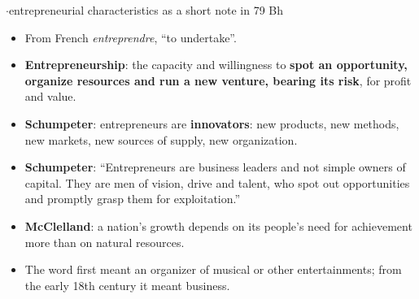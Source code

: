 {\color{sub}\footnotesize {}  \gap$\cdot$\gap entrepreneurial characteristics as a short note in 79 Bh}
\begin{itemize}
  \item From French \textit{entreprendre}, ``to undertake''.
  \item \textbf{Entrepreneurship}: the capacity and willingness to \textbf{spot an
    opportunity, organize resources and run a new venture, bearing its risk}, for profit and
    value.
  \item \textbf{Schumpeter}: entrepreneurs are \textbf{innovators}: new products, new
    methods, new markets, new sources of supply, new organization.
  \item \textbf{Schumpeter}: ``Entrepreneurs are business leaders and not simple owners of
    capital. They are men of vision, drive and talent, who spot out opportunities and
    promptly grasp them for exploitation.''
  \item \textbf{McClelland}: a nation's growth depends on its people's need for achievement
    more than on natural resources.
  \item The word first meant an organizer of musical or other entertainments; from the
    early 18th century it meant business.
\end{itemize}
